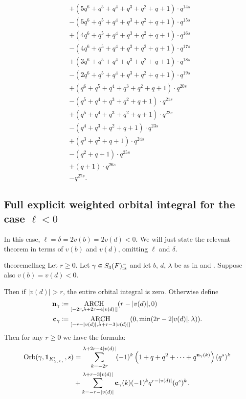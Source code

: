 \begin{example}
\begin{align*}
    &+ (5q^6 + q^5 + q^4 + q^3 + q^2 + q + 1) \cdot q^{14s} \\
    &- (5q^6 + q^5 + q^4 + q^3 + q^2 + q + 1) \cdot q^{15s} \\
    &+ (4q^6 + q^5 + q^4 + q^3 + q^2 + q + 1) \cdot q^{16s} \\
    &- (4q^6 + q^5 + q^4 + q^3 + q^2 + q + 1) \cdot q^{17s} \\
    &+ (3q^6 + q^5 + q^4 + q^3 + q^2 + q + 1) \cdot q^{18s} \\
    &- (2q^6 + q^5 + q^4 + q^3 + q^2 + q + 1) \cdot q^{19s} \\
    &+ (q^6 + q^5 + q^4 + q^3 + q^2 + q + 1) \cdot q^{20s} \\
    &- (q^5 + q^4 + q^3 + q^2 + q + 1) \cdot q^{21s} \\
    &+ (q^5 + q^4 + q^3 + q^2 + q + 1) \cdot q^{22s} \\
    &- (q^4 + q^3 + q^2 + q + 1) \cdot q^{23s} \\
    &+ (q^3 + q^2 + q + 1) \cdot q^{24s} \\
    &- (q^2 + q + 1) \cdot q^{25s} \\
    &+ (q + 1) \cdot q^{26s} \\
    &- q^{27s}.
  \end{align*}
\end{example}


\subsection{Full explicit weighted orbital integral for the case $\ell < 0$}
In this case, $\ell = \delta = 2v(b) = 2v(d) < 0$.
We will just state the relevant theorem in terms of $v(b)$ and $v(d)$, omitting $\ell$ and $\delta$.
\begin{restatable}[Weighted orbital integral when $v(b)=v(d)<0$]{theorem}{ellneg}
  \label{thm:full_orbital_ell_neg}
  Let $r \ge 0$.
  Let $\gamma \in S_3(F)_{\mathrm{rs}}^-$ and let $b$, $d$, $\lambda$ be as in
   and .
  Suppose also $v(b) = v(d) < 0$.

  Then if $|v(d)| > r$, the entire orbital integral is zero.
  Otherwise define
  \begin{align*}
    \mathbf n_\gamma &\coloneqq \operatorname*{ARCH}_{[-2r, \lambda+2r-4|v(d)|]}(r-|v(d)|, 0) \\
    \mathbf c_\gamma &\coloneqq \operatorname*{ARCH}_{[-r-|v(d)|, \lambda+r-3|v(d)|]} (0, \min(2r-2|v(d)|, \lambda)).
  \end{align*}
  Then for any $r \ge 0$ we have the formula:
  \begin{align*}
    \operatorname{Orb}(\gamma, \mathbf{1}_{K'_{S, \le r}}, s)
    &= \sum_{k = -2r}^{\lambda + 2r-4|v(d)|}
    (-1)^k \left( 1 + q + q^2 + \dots + q^{\mathbf n_{\gamma}(k)} \right) (q^s)^k \\
    &+ \sum_{k = -r-|v(d)|}^{\lambda+r-3|v(d)|} \mathbf c_\gamma(k) (-1)^k q^{r-|v(d)|} (q^s)^k.
  \end{align*}
\end{restatable}

